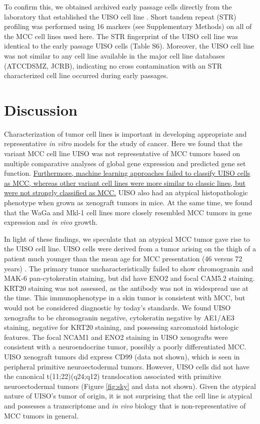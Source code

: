\documentclass[10pt]{article}
\begin{document}
To confirm this, we obtained archived early passage cells directly from the laboratory that established the UISO cell line \citep{Ronan1993Merkel}.
Short tandem repeat (STR) profiling \citep{Masters2001Short} was performed using 16 markers (see Supplementary Methods) on all of the MCC cell lines used here.
The STR fingerprint of the UISO cell line was identical to the early passage UISO cells (Table S6).
Moreover, the UISO cell line was not similar to any cell line available in the major cell line databases (ATCCDSMZ, JCRB), indicating no cross contamination with an STR characterized cell line occurred during early passages.

\section*{Discussion}

Characterization of tumor cell lines is important in developing appropriate and representative \emph{in vitro} models for the study of cancer.
Here we found that the variant MCC cell line UISO was not representative of MCC tumors based on multiple comparative analyses of global gene expression and predicted gene set function.
\uline{Furthermore, machine learning approaches failed to classify UISO cells as MCC, whereas other variant cell lines were more similar to classic lines, but were not strongly classified as MCC.}
UISO also had an atypical histopathologic phenotype when grown as xenograft tumors in mice.
At the same time, we found that the WaGa and Mkl-1 cell lines more closely resembled MCC tumors in gene expression and \emph{in vivo} growth.


In light of these findings, we speculate that an atypical MCC tumor gave rise to the UISO cell line.
UISO cells were derived from a tumor arising on the thigh of a patient much younger than the mean age for MCC presentation (46 versus 72 years) \citep{Ronan1993Merkel}.
The primary tumor uncharacteristically failed to show chromogranin and MAK-6 pan-cytokeratin staining, but did have ENO2 and focal CAM5.2 staining.
KRT20 staining was not assessed, as the antibody was not in widespread use at the time.
This immunophenotype in a skin tumor is consistent with MCC, but would not be considered diagnostic by today's standards.
We found UISO xenografts to be chromogranin negative, cytokeratin negative by AE1/AE3 staining, negative for KRT20 staining, and possessing sarcomatoid histologic features.
The focal NCAM1 and ENO2 staining in UISO xenografts were consistent with a neuroendocrine tumor, possibly a poorly differentiated MCC.
UISO xenograft tumors did express CD99 (data not shown), which is seen in peripheral primitive neuroectodermal tumors.
However, UISO cells did not have the canonical t(11;22)(q24;q12) translocation associated with primitive neuroectodermal tumors (Figure \ref{fig:sky} and data not shown)\citep{TurcCarel1988Chromosomes}.
Given the atypical nature of UISO’s tumor of origin, it is not surprising that the cell line is atypical and possesses a transcriptome and \emph{in vivo} biology that is non-representative of MCC tumors in general.
\end{document}
